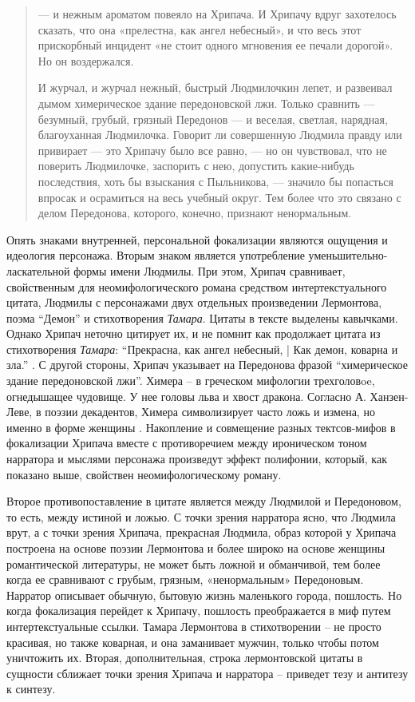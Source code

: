 \documentclass[12pt,a4paper]{article}
\begin{document}
\begin{quote}

— и нежным ароматом повеяло на Хрипача. И Хрипачу
вдруг захотелось сказать, что она «прелестна, как ангел небесный», и
что весь этот прискорбный инцидент «не стоит одного мгновения ее 
печали дорогой». Но он воздержался.

И журчал, и журчал нежный, быстрый Людмилочкин лепет, и 
развеивал дымом химерическое здание передоновской лжи. Только 
сравнить — безумный, грубый, грязный Передонов — и веселая, светлая,
нарядная, благоуханная Людмилочка. Говорит ли совершенную 
Людмила правду или привирает — это Хрипачу было все равно, — но он 
чувствовал, что не поверить Людмилочке, заспорить с нею, допустить 
какие-нибудь последствия, хоть бы взыскания с Пыльникова, — значило
бы попасться впросак и осрамиться на весь учебный округ. Тем более
что это связано с делом Передонова, которого, конечно, признают 
ненормальным.

\parencite[240]{sologub2004}
\end{quote}

Опять знаками внутренней, персональной фокализации являются ощущения и идеология персонажа. Вторым знаком является употребление уменьшительно-ласкательной формы имени Людмилы.  При этом, Хрипач сравнивает, свойственным для неомифологического романа средством интертекстуального цитата, Людмилы с персонажами двух отдельных произведении Лермонтова, поэма \enquote{Демон} и стихотворения \emph{Тамара}. Цитаты в тексте выделены кавычками. Однако Хрипач неточно цитирует их, и не помнит как продолжает цитата из стихотворения \emph{Тамара}: \enquote{Прекрасна, как ангел небесный, | Как демон, коварна и зла.} \parencite[194]{lermontov2000}. С другой стороны, Хрипач указывает на Передонова фразой \enquote{химерическое здание передоновской лжи}. Химера – в греческом мифологии трехголовoe, огнедышащее чудовище. У нее головы льва и хвост дракона. Согласно А. Ханзен-Леве, в поэзии декадентов, Химера символизирует часто ложь и измена, но именно в форме женщины \parencite[200]{hansen-love1999}. Накопление и совмещение разных тектсов-мифов в фокализации Хрипача вместе с противоречием между ироническом тоном нарратора и мыслями персонажа произведут эффект полифонии, который, как показано выше, свойствен неомифологическому роману.

Второе противопоставление в цитате является между Людмилой и Передоновом, то есть, между истиной и ложью. С точки зрения нарратора ясно, что Людмила врут, а с точки зрения Хрипача, прекрасная Людмила, образ которой у Хрипача построена на основе поэзии Лермонтова и более широко на основе женщины романтической литературы, не может быть ложной и обманчивой, тем более когда ее сравнивают с грубым, грязным, «ненормальным» Передоновым. Нарратор описывает обычную, бытовую жизнь маленького города, пошлость. Но когда фокализация перейдет к Хрипачу, пошлость преображается в миф путем интертекстуальные ссылки. Тамара Лермонтова в стихотворении – не просто красивая, но также коварная, и она заманивает мужчин, только чтобы потом уничтожить их. Вторая, дополнительная, строка лермонтовской цитаты в сущности сближает точки зрения Хрипача и нарратора – приведет тезу и антитезу к синтезу.  
\end{document}
